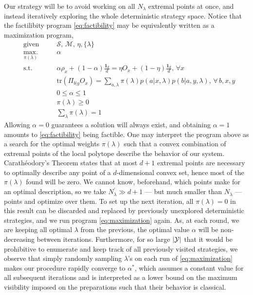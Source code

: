 \documentclass[a4paper,preprintnumbers,floatfix,superscriptaddress,pra,twocolumn,showpacs,notitlepage,longbibliography]{revtex4-2}
\begin{document}
    Our strategy will be to avoid working on all $N_\lambda$ extremal points at once, and instead iteratively exploring the whole deterministic strategy space. Notice that the factilibity program \eqref{eq:factibility} may be equivalently written as a maximization program,
    \begin{subequations}
    	\begin{alignat}{2}
    		&\text{given}    &\quad & \mathcal{S},\, \mathcal{M},\, \eta, \{ \lambda \} \\
            &\underset{\pi(\lambda)}{\text{max.}}   &	  & \alpha \\
    		&\text{s.t.}    &      & \alpha \rho_x + (1 - \alpha)\frac{\bm{1}_d}{d} = \eta O_x + \left( 1 - \eta \right) \frac{\bm{1}_d}{d}, \,\forall x \\
    		&                  &      & \text{tr}(\Pi_{b \vert y} O_x) = \sum_{a, \lambda} \pi(\lambda) p(a \vert x, \lambda) p(b \vert a, y, \lambda), \,\forall\, b, x, y \\
    		&				   &	  & 0 \leq \alpha \leq 1 \\
    		&				   &	  & \pi(\lambda) \geq 0 \\
    		&				   &	  & \sum_\lambda \pi(\lambda) = 1
    	\end{alignat}
    	\label{eq:maximization}
    \end{subequations}
    Allowing $\alpha = 0$ guarantees a solution will always exist, and obtaining $\alpha = 1$ amounts to \eqref{eq:factibility} being factible. One may interpret the program above as a search for the optimal weights $\pi(\lambda)$ such that a convex combination of extremal points of the local polytope describe the behavior of our system. Carathéodory's Theorem \cite{rockafellar-convex-1970} states that at most $d+1$ extremal points are necessary to optimally describe any point of a $d$-dimensional convex set, hence most of the $\pi(\lambda)$ found will be zero. We cannot know, beforehand, which points make for an optimal description, so we take $N_\lambda^\prime \gg d+1$ --- but much smaller than $N_\lambda$ --- points and optimize over them. To set up the next iteration, all $\pi(\lambda) = 0$ in this result can be discarded and replaced by previously unexplored deterministic strategies, and we run program \eqref{eq:maximization} again. As, at each round, we are keeping all optimal $\lambda$ from the previous, the optimal value $\alpha$ will be non-decreasing between iterations. Furthermore, for so large $\abs{\mathcal{Y}}$ that it would be prohibitive to enumerate and keep track of all previously visited strategies, we observe that simply randomly sampling $\lambda$'s on each run of \eqref{eq:maximization} makes our procedure rapidly converge to $\alpha^*$, which assumes a constant value for all subsequent iterations and is interpreted as a lower bound on the maximum visibility imposed on the preparations such that their behavior is classical.
    
\end{document}
